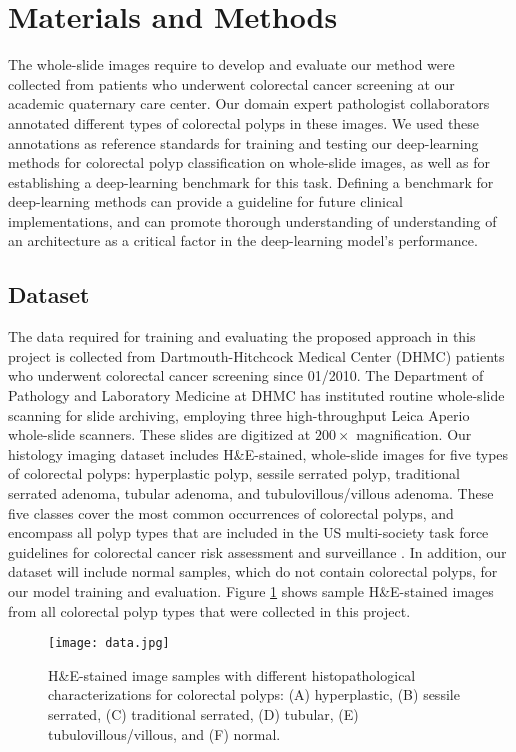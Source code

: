 \documentclass[review]{elsarticle}
\begin{document}
\section{Materials and Methods}\label{materials_head}
The whole-slide images require to develop and evaluate our method were collected from patients who underwent colorectal cancer screening at our academic quaternary care center. Our domain expert pathologist collaborators annotated different types of colorectal polyps in these images. We used these annotations as reference standards for training and testing our deep-learning methods for colorectal polyp classification on whole-slide images, as well as for establishing a deep-learning benchmark for this task. Defining a benchmark for deep-learning methods can provide a guideline for future clinical implementations, and can promote thorough understanding of understanding of an architecture as a critical factor in the deep-learning model’s performance.

\subsection{Dataset}\label{dataset}
The data required for training and evaluating the proposed approach in this project is collected from Dartmouth-Hitchcock Medical Center (DHMC) patients who underwent colorectal cancer screening since 01/2010. The Department of Pathology and Laboratory Medicine at DHMC has instituted routine whole-slide scanning for slide archiving, employing three high-throughput Leica Aperio whole-slide scanners. These slides are digitized at $200\times$ magnification. Our histology imaging dataset includes H\&E-stained, whole-slide images for five types of colorectal polyps: hyperplastic polyp, sessile serrated polyp, traditional serrated adenoma, tubular adenoma, and tubulovillous/villous adenoma. These five classes cover the most common occurrences of colorectal polyps, and encompass all polyp types that are included in the US multi-society task force guidelines for colorectal cancer risk assessment and surveillance \citep{lieberman2012guidelines}. In addition, our dataset will include normal samples, which do not contain colorectal polyps, for our model training and evaluation. Figure \ref{fig:data} shows sample H\&E-stained images from all colorectal polyp types that were collected in this project.

\begin{figure}[h!]
\centering
\texttt{[image: data.jpg]}
\caption{H\&E-stained image samples with different histopathological characterizations for colorectal polyps: (A) hyperplastic, (B) sessile serrated, (C) traditional serrated, (D) tubular, (E) tubulovillous/villous, and (F) normal.}
\label{fig:data}
\end{figure}
\end{document}
